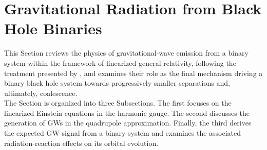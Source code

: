 \documentclass[12pt,twoside,openany]{book}
\begin{document}
\section{Gravitational Radiation from Black Hole Binaries}
\label{sec:Gravitational Radiation from Black Hole Binaries}
This Section reviews the physics of gravitational-wave emission from a binary system within the framework of linearized general relativity, following the treatment presented by \textcite{Maggiore_book}, and examines their role as the final mechanism driving a binary black hole system towards progressively smaller separations and, ultimately, coalescence.\\The Section is organized into three Subsections. The first focuses on the linearized Einstein equations in the harmonic gauge. The second discusses the generation of GWs in the quadrupole approximation. Finally, the third derives the expected GW signal from a binary system and examines the associated radiation-reaction effects on its orbital evolution.
\end{document}
